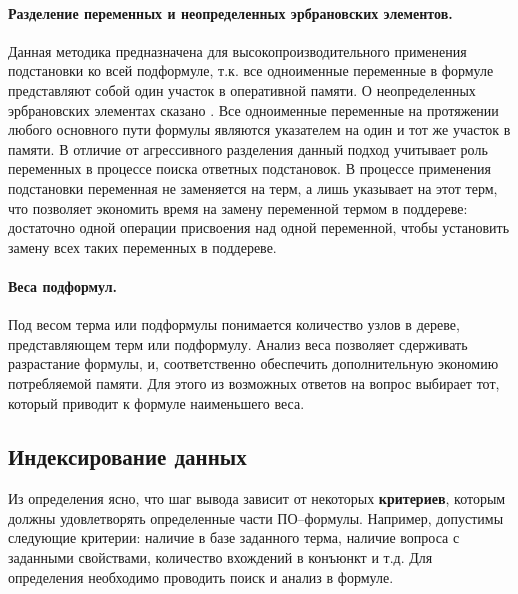 \paragraph{Разделение переменных и неопределенных эрбрановских элементов.} Данная методика предназначена для высокопроизводительного применения подстановки ко всей подформуле, т.к. все одноименные переменные в формуле представляют собой один участок в оперативной памяти. О неопределенных эрбрановских элементах сказано . Все одноименные переменные на протяжении любого основного пути формулы \cite{dissChe} являются указателем на один и тот же участок в памяти. В отличие от агрессивного разделения данный подход учитывает роль переменных в процессе поиска ответных подстановок. В процессе применения подстановки переменная не заменяется на терм, а лишь указывает на этот терм, что позволяет экономить время на замену переменной термом в поддереве: достаточно одной операции присвоения над одной переменной, чтобы установить замену всех таких переменных в поддереве.

\paragraph{Веса подформул.} Под весом терма или подформулы понимается количество узлов в дереве, представляющем терм или подформулу. Анализ веса позволяет сдерживать разрастание формулы, и, соответственно обеспечить дополнительную экономию потребляемой памяти. Для этого из возможных ответов на вопрос выбирает  тот, который приводит к формуле наименьшего веса.


\subsection{Индексирование данных}

Из определения  ясно, что шаг вывода зависит от некоторых \textbf{критериев}, которым должны удовлетворять определенные части ПО--формулы. Например, допустимы следующие критерии: наличие в базе заданного терма, наличие вопроса с заданными свойствами, количество вхождений  в конъюнкт и т.д. Для определения  необходимо проводить поиск и анализ  в формуле. 

